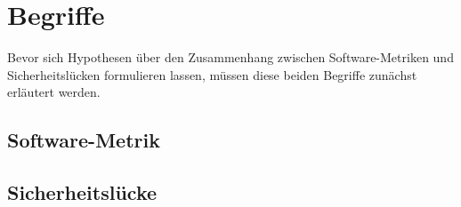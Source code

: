 \section{Begriffe}
\label{sec:begriffe}
Bevor sich Hypothesen über den Zusammenhang zwischen Software-Metriken und Sicherheitslücken formulieren lassen, müssen diese beiden Begriffe zunächst erläutert werden.

\subsection{Software-Metrik}

\subsection{Sicherheitslücke}
